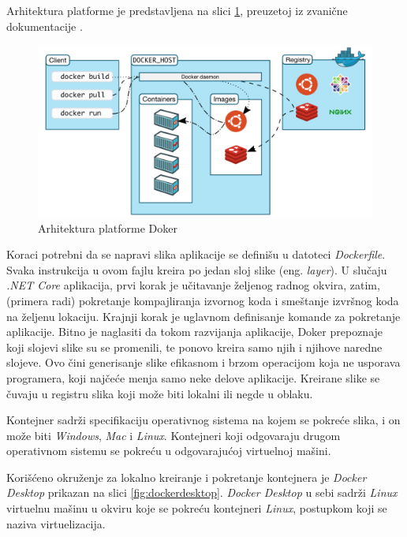 \documentclass[12pt,oneside]{memoir}
\begin{document}
Arhitektura platforme je predstavljena na slici \ref{fig:dockerarch}, preuzetoj iz zvanične dokumentacije \cite{DockerArch}. 

\begin{figure}[!ht]
  \centering
  \includegraphics[width=1.0\textwidth]{./images/docker_architecture.png}
  \caption{Arhitektura platforme Doker}
  \label{fig:dockerarch}
\end{figure}

Koraci potrebni da se napravi slika aplikacije se definišu u datoteci \emph{Dockerfile}. Svaka instrukcija u ovom fajlu kreira po jedan sloj slike (eng. \emph{layer}). U slučaju \emph{.NET Core} aplikacija, prvi korak je učitavanje željenog radnog okvira, zatim, (primera radi) pokretanje kompajliranja izvornog koda i smeštanje izvršnog koda na željenu lokaciju. Krajnji korak je uglavnom definisanje komande za pokretanje aplikacije. Bitno je naglasiti da tokom razvijanja aplikacije, Doker prepoznaje koji slojevi slike su se promenili, te ponovo kreira samo njih i njihove naredne slojeve. Ovo čini generisanje slike efikasnom i brzom operacijom koja ne usporava programera, koji najčeće menja samo neke delove aplikacije. Kreirane slike se čuvaju u registru slika koji može biti lokalni ili negde u oblaku.

Kontejner sadrži specifikaciju operativnog sistema na kojem se pokreće slika, i on može biti \emph{Windows}, \emph{Mac} i \emph{Linux}. Kontejneri koji odgovaraju drugom operativnom sistemu se pokreću u odgovarajućoj virtuelnoj mašini.

Korišćeno okruženje za lokalno kreiranje i pokretanje kontejnera je \emph{Docker Desktop} \cite{DockerDesktop} prikazan na slici \ref{fig:dockerdesktop}. \emph{Docker Desktop} u sebi sadrži \emph{Linux} virtuelnu mašinu u okviru koje se pokreću kontejneri \emph{Linux}, postupkom koji se naziva virtuelizacija.
\end{document}
